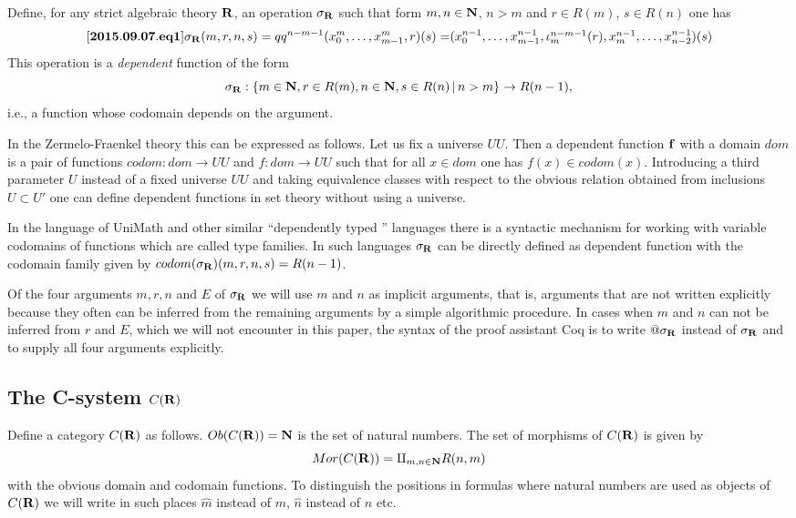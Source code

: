 \documentclass[11pt]{article}
\newenvironment{eq}{\begin{equation}}{\end{equation}}
\newcommand{\llabel}[1]{\label{#1}[{\bf #1}]}
\newcommand{\sr}{\rightarrow}
\newcommand{\nn}{{\bf N\rm}}
\newcommand{\nat}{\nn}
\newcommand{\rr}{{\bf R}}
\newcommand{\wh}{\widehat}
\begin{document}
Define, for any strict algebraic theory $\rr$, an operation $\sigma_{\rr}$ such that form $m,n\in\nat$, $n>m$ and $r\in R(m)$, $s\in R(n)$ one has
%
\begin{eq}
\llabel{2015.09.07.eq1}
\sigma_{\rr}(m,r,n,s)=qq^{n-m-1}(x_0^m,\dots,x_{m-1}^m,r)(s)=$$
$$(x_0^{n-1},\dots,x_{m-1}^{n-1},\iota_{m}^{n-m-1}(r),x_m^{n-1},\dots,x_{n-2}^{n-1})(s)
\end{eq}
%
This operation is a {\em dependent} function of the form
%
$$\sigma_{\rr}:\{m\in\nat,r\in R(m),n\in\nat,s\in R(n)\,|\,n>m\}\sr R(n-1),$$
%
i.e., a function whose codomain depends on the argument. 

In the Zermelo-Fraenkel theory this can be expressed as follows. Let us fix a universe $UU$. Then a dependent function ${\bf f}$ with a domain $dom$ is a pair of functions $codom:dom\sr UU$ and $f:dom\sr UU$ such that for all $x\in dom$ one has $f(x)\in codom(x)$.  Introducing a third parameter $U$ instead of a fixed universe $UU$ and taking equivalence classes with respect to the obvious relation obtained from inclusions $U\subset U'$ one can define dependent functions in set theory without using a universe. 

In the language of UniMath and other similar ``dependently typed '' languages there is a syntactic mechanism for working with variable codomains of functions which are called type families. In such languages $\sigma_{\rr}$ can be directly defined as dependent function with the codomain family given by  $codom(\sigma_{\rr})(m,r,n,s)=R(n-1)$. 

Of the four arguments $m,r,n$ and $E$ of $\sigma_{\rr}$ we will use $m$ and $n$ as implicit arguments, that is, arguments that are not written explicitly because they often can be inferred from the remaining arguments by a simple algorithmic procedure. In cases when $m$ and $n$ can not be inferred from $r$ and $E$, which we will not encounter in this paper, the syntax of the proof assistant Coq is to write $@\sigma_{\rr}$ instead of $\sigma_{\rr}$ and to supply all four arguments explicitly. 

\subsection{The C-system $C(\rr)$}
%

Define a category $C(\rr)$ as follows. $Ob(C(\rr))=\nn$ is the set of natural numbers. The set of morphisms of $C(\rr)$ is given by
%
$$Mor(C(\rr))=\amalg_{m,n\in\nn}R(n,m)$$
%
with the obvious domain and codomain functions. To distinguish the positions in formulas where natural numbers are used as objects of $C(\rr)$ we will write in such places $\wh{m}$ instead of $m$, $\wh{n}$ instead of $n$ etc.  
\end{document}
